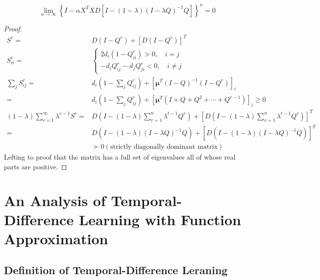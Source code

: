 \begin{thm}
\begin{equation}
     \lim_{n \to \infty}{\left\{ I- \alpha X^T X D [ I - (1-\lambda) {(I-\lambda Q) }^{-1} Q ] \right\}}^n =0
\end{equation}
\begin{proof}
    \begin{equation}
        \begin{aligned}
            S^r =& D(I-Q^r) + {[D(I-Q^r)]}^T\\
            S^r_{ii} =& 
            \begin{cases}
                2d_i(1-Q^r_{ii}) > 0 ,\quad i=j \\
                -d_i Q^r_{ij} - d_j Q^r_{ji} < 0,\quad i\ne j
            \end{cases} \\
            \sum^{}_{j} S^r_{ij} 
            =& d_i \left( 1 - \sum^{}_{j}  Q^r_{ij} \right) +
            {[\mathbf{\mu}^T {(I - Q)}^{-1}(I-Q^r) ]}_i \\
            =& d_i \left( 1 - \sum^{}_{j}  Q^r_{ij} \right) +
            {{[ \mathbf{\mu}^T (I + Q + Q^2 + \cdots + Q^{r-1}) ] }_i} \ge 0 \\
            (1-\lambda) \sum^{\infty}_{r=1} \lambda ^{r-1} S^r 
            =& 
            D(I - (1-\lambda) \sum^{n}_{r=1} \lambda ^{t-1} Q^r)+
            {\left[D(I - (1-\lambda) \sum^{n}_{r=1} \lambda ^{t-1} Q^r)\right]}^T \\
            =& D(I - (1-\lambda){(I - \lambda Q)} ^{-1} Q)
            + {\left[ D(I - (1-\lambda){(I - \lambda Q)} ^{-1} Q) \right] }^T \\
             & \succ 0 (\text{strictly diagonally dominant matrix})
        \end{aligned}
    \end{equation}
    Lefting to proof that the matrix has a full set of eigenvalues all of whose real parts are positive.
\end{proof}
\end{thm}

\section{An Analysis of Temporal-Difference Learning with Function Approximation~\cite{Tsitsiklis1997}}%
\label{sec:an_analysis_of_temporal_difference_learning_with_function_approximation}

\subsection{Definition of Temporal-Difference Leraning}%
\label{sub:definition_of_temporal_difference_leraning}

